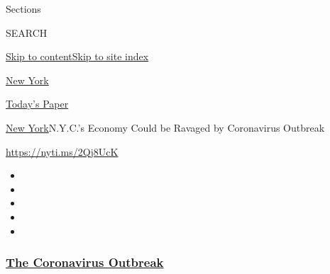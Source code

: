 Sections

SEARCH

\protect\hyperlink{site-content}{Skip to
content}\protect\hyperlink{site-index}{Skip to site index}

\href{https://www.nytimes3xbfgragh.onion/section/nyregion}{New York}

\href{https://myaccount.nytimes3xbfgragh.onion/auth/login?response_type=cookie\&client_id=vi}{}

\href{https://www.nytimes3xbfgragh.onion/section/todayspaper}{Today's
Paper}

\href{/section/nyregion}{New York}\textbar{}N.Y.C.'s Economy Could be
Ravaged by Coronavirus Outbreak

\url{https://nyti.ms/2Qj8UcK}

\begin{itemize}
\item
\item
\item
\item
\item
\end{itemize}

\hypertarget{the-coronavirus-outbreak}{%
\subsubsection{\texorpdfstring{\href{https://www.nytimes3xbfgragh.onion/news-event/coronavirus?name=styln-coronavirus-national\&region=TOP_BANNER\&variant=undefined\&block=storyline_menu_recirc\&action=click\&pgtype=Article\&impression_id=5fba8b30-e0fd-11ea-90ad-4f7da0581532}{The
Coronavirus
Outbreak}}{The Coronavirus Outbreak}}\label{the-coronavirus-outbreak}}

